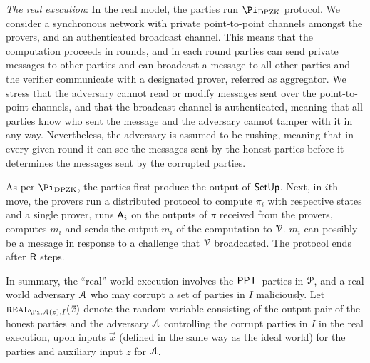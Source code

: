 \noindent\textit{The real execution}: In the real model, the parties run $\Pi_\DPZK$ protocol.  We consider a synchronous network with private point-to-point channels amongst the provers, and an authenticated broadcast channel. This means that the computation proceeds in rounds, and in each round parties can send private messages to other parties and can broadcast a message to all other parties and the verifier communicate with a designated prover, referred as aggregator. We stress that the adversary cannot read or modify messages sent over the point-to-point channels, and that the broadcast channel is authenticated, meaning that all parties know who sent the message and the adversary cannot tamper with it in any way. Nevertheless, the adversary is assumed to be rushing, meaning that in every given round it can see the messages sent by the honest parties before it determines the messages sent by the corrupted parties. 

As per $\Pi_\DPZK$, the parties first produce the output of $\mathsf{SetUp}$. Next, in $i$th move,  the  provers run a distributed protocol to compute $\pi_i$ with respective states and a single prover, runs $\mathsf{A}_i$ on the outputs of $\pi$ received from the provers, computes $m_i$ and sends the output $m_i$ of the computation to $\mathcal{V}$. $m_i$ can possibly be  a message in response to a challenge that $\mathcal{V}$ broadcasted. The protocol ends after $\mathsf{R}$ steps.

In summary,  the ``real'' world execution involves the $\mathsf{PPT}$\ parties  in $\mathcal{P}$,  and a real world adversary $\mathcal{A}$ who may corrupt  a set of parties in $I$ maliciously.  Let $\Real_{\Pi, \Adv(z),I}(\vec{x})$ denote the random variable consisting of the output pair of the honest parties and the adversary $\mathcal{A}$ controlling the corrupt parties in $I$ in the real execution, upon inputs $\vec{x}$ (defined in the same way as the ideal world) for the parties and auxiliary input $z$ for $\mathcal{A}$. 

